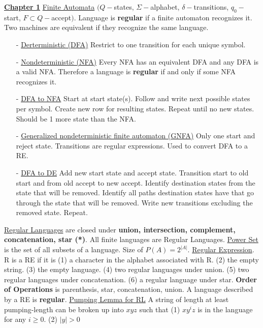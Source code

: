 \documentclass[9pt]{article}
\begin{document}
\noindent\uline{\textbf{Chapter 1}}\newline
\uline{Finite Automata} $(Q - $states, $\Sigma - $alphabet, $ \delta - $transitions,
$q_0 - $start, $F\subset Q - $accept$)$. Language is \textbf{regular} if a finite 
automaton recognizes it. Two machines are equivalent if they recognize the same
language.
\begin{itemize}[noitemsep, topsep=0pt]
    \item[-]\uline{Derterministic (DFA)} Restrict to one transition for each unique 
    symbol.
    \item[-]\uline{Nondeterministic (NFA)} Every NFA has an equivalent DFA and any 
    DFA is a valid NFA. Therefore a language is \textbf{regular} if and only if some 
    NFA recognizes it. 
    \item[-]\uline{DFA to NFA} Start at start state(s). Follow and write next possible 
    states per symbol. Create new row for resulting states. Repeat until no new states.
    Should be 1 more state than the NFA.
    \item[-]\uline{Generalized nondeterministic finite automaton (GNFA)} Only one start
    and reject state. Transitions are regular expressions. Used to convert DFA to a RE.
    \item[-]\uline{DFA to DE} Add new start state and accept state. Transition start 
    to old start and from old accept to new accept. Identify destination states from 
    the state that will be removed. Identify all paths destination states have that go
    through the state that will be removed. Write new transitions excluding the removed
    state. Repeat.
\end{itemize}
\uline{Regular Languages} are closed under \textbf{union, intersection, complement, 
concatenation, star (*)}. All finite languages are Regular Languages. \newline
\uline{Power Set} is the set of all subsets of a language. Size of $P(A) = 2^{|A|}$. 
\newline
\uline{Regular Expression}. R is a RE if it is (1) a character in the alphabet 
associated with R. (2) the empty string. (3) the empty language. (4) two regular 
languages under union. (5) two regular languages under concatenation. (6) a regular 
language under star. \textbf{Order of Operations} is parenthesis, star, concatenation,
union. A language described by a RE is \textbf{regular}.\newline
\uline{Pumping Lemma for RL} A string of length at least pumping-length can be broken
up into $xyz$ such that (1) $xy^iz$ is in the language for any $i\geq 0$. (2) $|y|>0$
\end{document}
